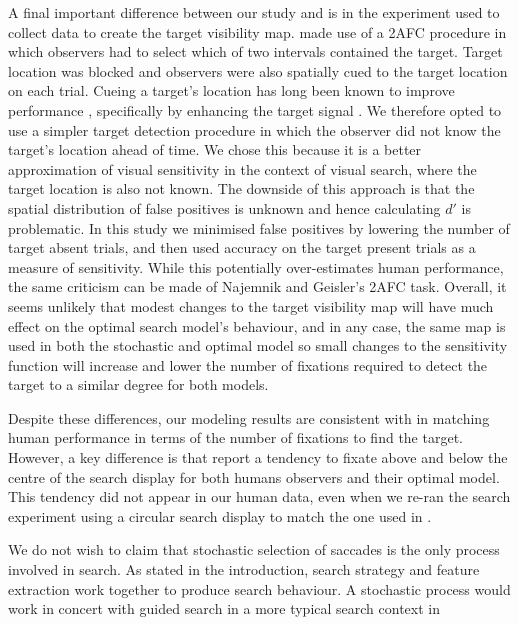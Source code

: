 \documentclass[preprint, authoryear]{elsarticle} %
\begin{document}
A final important difference between our study and \citet{najemnik-geisler2005
,najemnik-geisler2008} is in the experiment used to collect data to create the
target visibility map. \citet{najemnik-geisler2005,najemnik-geisler2008} made
use of a 2AFC procedure in which observers had to select which of two
intervals contained the target. Target location was blocked and observers were
also spatially cued to the target location on each trial. Cueing a target's
location has long been known to improve performance \citep{posner1980},
specifically by enhancing the target signal \citep{yeshurun1998}. We therefore
opted to use a simpler target detection procedure in which the observer did
not know the target's location ahead of time. We chose this because it is a
better approximation of visual sensitivity in the context of visual search,
where the target location is also not known. The downside of this approach is
that the spatial distribution of false positives is unknown and hence
calculating $d'$ is problematic. In this study we minimised false positives by
lowering the number of target absent trials, and then used accuracy on the
target present trials as a measure of sensitivity. While this potentially
over-estimates human performance, the same criticism can be made of Najemnik
and Geisler's 2AFC task. Overall, it seems unlikely that modest changes to the
target visibility map will have much effect on the optimal search model's
behaviour, and in any case, the same map is used in both the stochastic and
optimal model so small changes to the sensitivity function will increase and
lower the number of fixations required to detect the target to a similar
degree for both models. \par Despite these differences, our modeling results
are consistent with \cite{najemnik-geisler2005, najemnik-geisler2008} in
matching human performance in terms of the number of fixations to find the
target. However, a key difference is that \cite{najemnik-geisler2008} report a
tendency to fixate above and below the centre of the search display for both
humans observers and their optimal model. This tendency did not appear in our
human data, even when we re-ran the search experiment using a circular search
display to match the one used in \cite{najemnik-geisler2008}.  \par We do not
wish to claim that stochastic selection of saccades is the only process
involved in search. As stated in the introduction, search strategy and feature
extraction work together to produce search behaviour. A stochastic process
would work in concert with guided search in a more typical search context in
\end{document}
